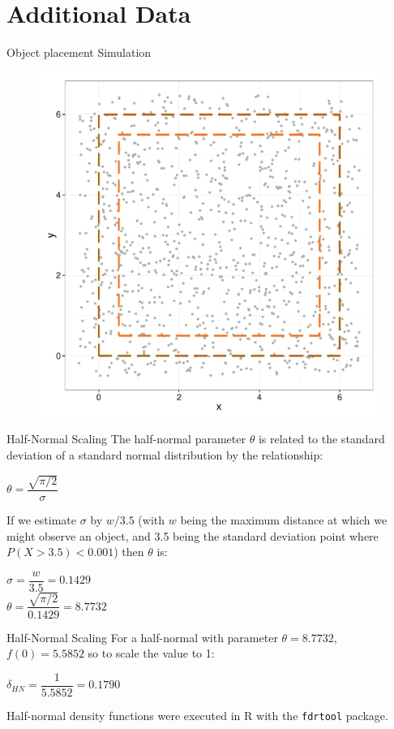\documentclass{beamer}
\begin{document}
\section{Additional Data}
\begin{frame}{Object placement Simulation}

	\begin{figure}
		\centering
		\includegraphics[height=.80\textheight]{../images/slides-pointGeneration.pdf}
	\end{figure}
\end{frame}

\begin{frame}{Half-Normal Scaling}
	The half-normal parameter $\theta$ is related to the standard deviation of a standard normal distribution by the relationship: 
	\begin{center}
	$\theta = \dfrac{\sqrt{\pi /2}}{\sigma}$
	\end{center}
	
	
	If we estimate $\sigma$ by $w/3.5$ (with $w$ being the maximum distance at which we might observe an object, and 3.5 being the standard deviation point where $P(X > 3.5) < 0.001$) then $\theta$ is:
	\begin{center}
	$\sigma = \dfrac{w}{3.5} = 0.1429$\\
	\vspace{0.5cm}
	$\theta = \dfrac{\sqrt{\pi /2}}{0.1429}=8.7732$
	\end{center}
\end{frame}

\begin{frame}{Half-Normal Scaling}
	For a half-normal with parameter $\theta=8.7732$, $f(0)=5.5852$ so to scale the value to 1:
	\begin{center}
	$\delta_{HN} = \dfrac{1}{5.5852} = 0.1790$
	\end{center}
	
	
	Half-normal density functions were executed in R with the \texttt{fdrtool} package.
\end{frame}
\end{document}
